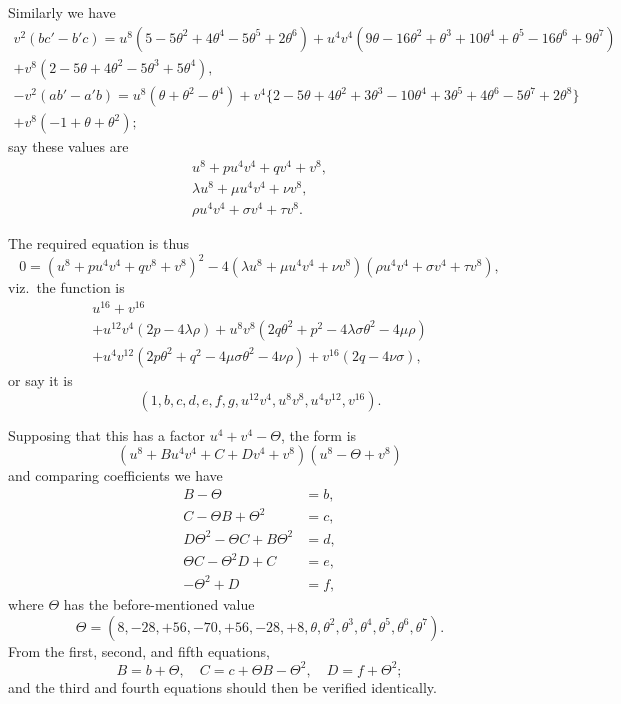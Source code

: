 \documentclass[11pt,a4paper]{book}
\providecommand{\between}{,}
\begin{document}
Similarly we have
\begin{multline*}
v^2(bc' - b'c) = u^8(5 - 5\theta^2 + 4\theta^4 - 5\theta^5 + 2\theta^6) + u^4 v^4(9\theta - 16\theta^2 + \theta^3 + 10\theta^4 + \theta^5 - 16\theta^6 + 9\theta^7)\\
+ v^8(2 - 5\theta + 4\theta^2 - 5\theta^3 + 5\theta^4),
\end{multline*}
\begin{multline*}
-v^2(ab' - a'b) = u^8(\theta + \theta^2 - \theta^4) + v^4\{2 - 5\theta + 4\theta^2 + 3\theta^3 - 10\theta^4 + 3\theta^5 + 4\theta^6 - 5\theta^7 + 2\theta^8\}\\
+ v^8(-1 + \theta + \theta^2);
\end{multline*}
say these values are
\begin{gather*}
u^8 + pu^4 v^4 + qv^4 + v^8,\\
\lambda u^8 + \mu u^4 v^4 + \nu v^8,\\
\rho u^4 v^4 + \sigma v^4 + \tau v^8.
\end{gather*}

The required equation is thus
\[
0 = (u^8 + pu^4 v^4 + qv^8 + v^8)^2 - 4(\lambda u^8 + \mu u^4 v^4 + \nu v^8)(\rho u^4 v^4 + \sigma v^4 + \tau v^8),
\]
viz.\ the function is
\begin{multline*}
u^{16} + v^{16}\\
+ u^{12}v^4(2p - 4\lambda\rho)
+ u^8 v^8(2q\theta^2 + p^2 - 4\lambda\sigma\theta^2 - 4\mu\rho)\\
+ u^4 v^{12}(2p\theta^2 + q^2 - 4\mu\sigma\theta^2 - 4\nu\rho)
+ v^{16}(2q - 4\nu\sigma),
\end{multline*}
or say it is
\[
(1, b, c, d, e, f, g \between u^{12}v^4, u^8 v^8, u^4 v^{12}, v^{16}).
\]

\newpage
Supposing that this has a factor $u^4 + v^4 - \Theta$, the form is
\[
(u^8 + Bu^4 v^4 + C + Dv^4 + v^8)(u^8 - \Theta + v^8)
\]
and comparing coefficients we have
\begin{align*}
B - \Theta &= b,\\
C - \Theta B + \Theta^2 &= c,\\
D\Theta^2 - \Theta C + B\Theta^2 &= d,\\
\Theta C - \Theta^2 D + C &= e,\\
-\Theta^2 + D &= f,
\end{align*}
where $\Theta$ has the before-mentioned value
\[
\Theta = (8, -28, +56, -70, +56, -28, +8 \between \theta, \theta^2, \theta^3, \theta^4, \theta^5, \theta^6, \theta^7).
\]
From the first, second, and fifth equations,
\[
B = b + \Theta,\quad C = c + \Theta B - \Theta^2,\quad D = f + \Theta^2;
\]
and the third and fourth equations should then be verified identically.
\end{document}
